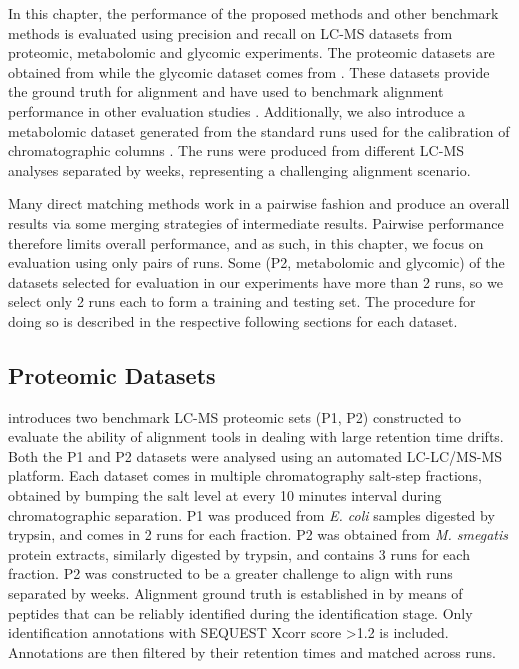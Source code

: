 In this chapter, the performance of the proposed methods and other benchmark methods is evaluated using precision and recall on LC-MS datasets from proteomic, metabolomic and glycomic experiments. The proteomic datasets are obtained from \cite{Lange2008} while the glycomic dataset comes from \cite{Tsai2013a}. These datasets provide the ground truth for alignment and have used to benchmark alignment performance in other evaluation studies \cite{Lange2008, Pluskal2010, Ballardini2011, Voss2011a, Tsai2013a}. Additionally, we also introduce a metabolomic dataset generated from the standard runs used for the calibration of chromatographic columns \cite{Creek2011}. The runs were produced from different LC-MS analyses separated by weeks, representing a challenging alignment scenario. 

Many direct matching methods work in a pairwise fashion and produce an overall results via some merging strategies of intermediate results. Pairwise performance therefore limits overall performance, and as such, in this chapter, we focus on evaluation using only pairs of runs. Some (P2, metabolomic and glycomic) of the datasets selected for evaluation in our experiments have more than 2 runs, so we select only 2 runs each to form a training and testing set. The procedure for doing so is described in the respective following sections for each dataset.

\subsection{Proteomic Datasets\label{sub:proteomic-dataset}}

\cite{Lange2008} introduces two benchmark LC-MS proteomic sets (P1, P2) constructed to evaluate the ability of alignment tools in dealing with large retention time drifts. Both the P1 and P2 datasets were analysed using an automated LC-LC/MS-MS platform. Each dataset comes in multiple chromatography salt-step fractions, obtained by bumping the salt level at every 10 minutes interval during chromatographic separation. P1 was produced from \textrm{\textit{E. coli}} samples digested by trypsin, and comes in 2 runs for each fraction. P2 was obtained from \textrm{\textit{M. smegatis}} protein extracts, similarly digested by trypsin, and contains 3 runs for each fraction. P2 was constructed to be a greater challenge to align with runs separated by weeks. Alignment ground truth is established in \cite{Lange2008} by means of peptides that can be reliably identified during the identification stage. Only identification annotations with SEQUEST Xcorr score \textgreater 1.2 is included. Annotations are then filtered by their retention times and matched across runs. 

